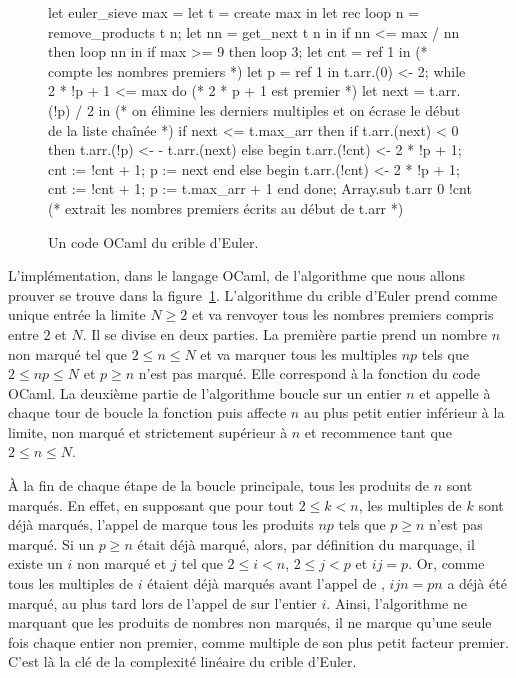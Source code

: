\documentclass[a4paper]{easychair}
\begin{document}
\begin{figure}[tp]
\begin{ocaml}
let euler_sieve max =
  let t = create max in
  let rec loop n =
    remove_products t n;
    let nn = get_next t n in
    if nn <= max / nn then loop nn in
  if max >= 9 then loop 3;
  let cnt = ref 1 in (* compte les nombres premiers *)
  let p = ref 1 in t.arr.(0) <- 2;
  while 2 * !p + 1 <= max do (* 2 * p + 1 est premier *)
    let next = t.arr.(!p) / 2 in
    (* on élimine les derniers multiples et on écrase le début de la liste chaînée *)
    if next <= t.max_arr then
      if t.arr.(next) < 0 then t.arr.(!p) <- - t.arr.(next)
      else begin t.arr.(!cnt) <- 2 * !p + 1; cnt := !cnt + 1; p := next end
    else begin t.arr.(!cnt) <- 2 * !p + 1; cnt := !cnt + 1; p := t.max_arr + 1 end
  done;
  Array.sub t.arr 0 !cnt (* extrait les nombres premiers écrits au début de t.arr *)
\end{ocaml}
\caption{Un code OCaml du crible d'Euler.}
\label{fig:codeOCaml}
\end{figure}

L'implémentation, dans le langage OCaml, de l'algorithme que nous allons
prouver se trouve dans la figure~\ref{fig:codeOCaml}.
L'algorithme du crible d'Euler prend comme unique entrée la limite $N \geq 2$
et va renvoyer tous les nombres premiers compris entre $2$ et $N$.
Il se divise en deux parties.
La première partie prend un nombre $n$ non marqué
tel que $2 \leq n \leq N$ et va marquer tous les multiples $np$ tels que
$2 \leq np \leq N$ et $p \geq n$ n'est pas marqué.
Elle correspond à la fonction  du code OCaml.
La deuxième partie de l'algorithme boucle sur un entier $n$ et appelle
à chaque tour de boucle la fonction  puis
affecte $n$ au plus petit entier inférieur à la limite,
non marqué et strictement supérieur à $n$
et recommence tant que $2 \leq n \leq N$.

À la fin de chaque étape de la boucle principale, tous les produits de $n$
sont marqués. En effet, en supposant que pour tout $2 \leq k < n$,
les multiples de $k$ sont déjà marqués, l'appel de 
marque tous les produits $np$ tels que $p \geq n$ n'est pas marqué.
Si un $p \geq n$ était déjà marqué,
alors, par définition du marquage, il existe un $i$ non marqué et $j$ tel que
$2 \leq i < n$, $2 \leq j < p$ et $ij = p$.
Or, comme tous les multiples de $i$
étaient déjà marqués avant l'appel de , $ijn = pn$
a déjà été marqué, au plus tard lors de l'appel de 
sur l'entier $i$.
Ainsi, l'algorithme ne marquant que les produits de nombres non marqués, il ne
marque qu'une seule fois chaque entier non premier, comme multiple de
son plus petit facteur premier. C'est là la clé de la complexité
linéaire du crible d'Euler.
\end{document}
